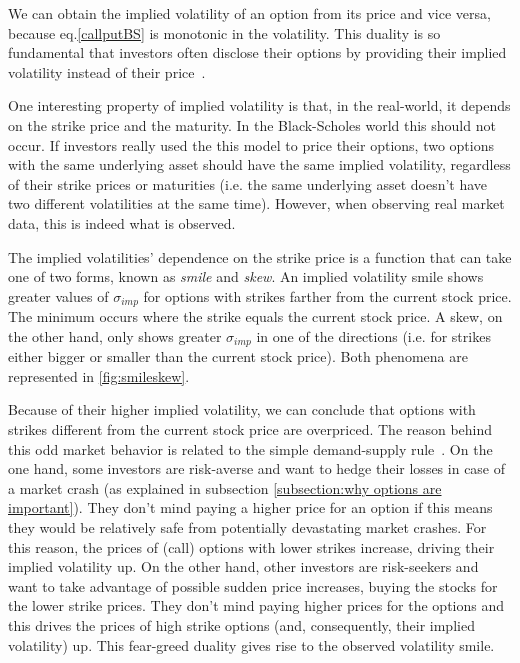 We can obtain the implied volatility of an option from its price and vice versa, because eq.\eqref{callputBS} is monotonic in the volatility. This duality is so fundamental that investors often disclose their options by providing their implied volatility instead of their price~\cite{Wilmott}.

One interesting property of implied volatility is that, in the real-world, it depends on the strike price and the maturity. In the Black-Scholes world this should not occur. If investors really used the this model to price their options, two options with the same underlying asset should have the same implied volatility, regardless of their strike prices or maturities (i.e. the same underlying asset doesn't have two different volatilities at the same time).
However, when observing real market data, this is indeed what is observed.

The implied volatilities' dependence on the strike price is a function that can take one of two forms, known as \emph{smile} and \emph{skew}.
An implied volatility smile shows greater values of $\sigma_{imp}$ for options with strikes farther from the current stock price. The minimum occurs where the strike equals the current stock price. A skew, on the other hand, only shows greater $\sigma_{imp}$ in one of the directions (i.e. for strikes either bigger or smaller than the current stock price). Both phenomena are represented in \autoref{fig:smileskew}.

Because of their higher implied volatility, we can conclude that options with strikes different from the current stock price are overpriced.
The reason behind this odd market behavior is related to the simple demand-supply rule~\cite{Wilmott3}. On the one hand, some investors are risk-averse and want to hedge their losses in case of a market crash (as explained in subsection \ref{subsection:why options are important}). They don't mind paying a higher price for an option if this means they would be relatively safe from potentially devastating market crashes. For this reason, the prices of (call) options with lower strikes increase, driving their implied volatility up. On the other hand, other investors are risk-seekers and want to take advantage of possible sudden price increases, buying the stocks for the lower strike prices. They don't mind paying higher prices for the options and this drives the prices of high strike options (and, consequently, their implied volatility) up. This fear-greed duality gives rise to the observed volatility smile.
   
